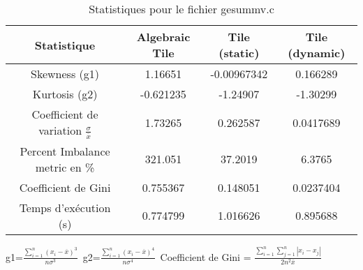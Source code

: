\documentclass{article}
\begin{document}
\begin{table}[htbp]
  \centering
  \caption{Statistiques pour le fichier gesummv.c}
  \begin{tabular}{|c|c|c|c|}
    \hline
    Statistique & Algebraic Tile & Tile (static) & Tile (dynamic) \\ 
    \hline
    Skewness (g1)  & 1.16651 & -0.00967342 & 0.166289 \\ 
    Kurtosis (g2)  & -0.621235 & -1.24907 & -1.30299 \\ 
    Coefficient de variation $ \frac{\sigma}{\overline{x}} $ & 1.73265 & 0.262587 & 0.0417689\\ 
    Percent Imbalance metric en \% & 321.051 & 37.2019 & 6.3765\\ 
    Coefficient de Gini  & 0.755367 & 0.148051 & 0.0237404\\ 
    Temps d'exécution (s) &  0.774799    &  1.016626   &  0.895688   \\ 

    \hline
  \end{tabular}
\end{table}
g1=$ \frac{\sum_{i=1}^{n} (x_i - \overline{x})^3}{n\sigma^3} $\
g2=$ \frac{\sum_{i=1}^{n} (x_i - \overline{x})^4}{n\sigma^4} $\
Coefficient de Gini = $ \frac{\sum_{i=1}^{n}\sum_{j=1}^{n} |x_i - x_j|}{2n^2\overline{x}} $\
\newpage
\end{document}
